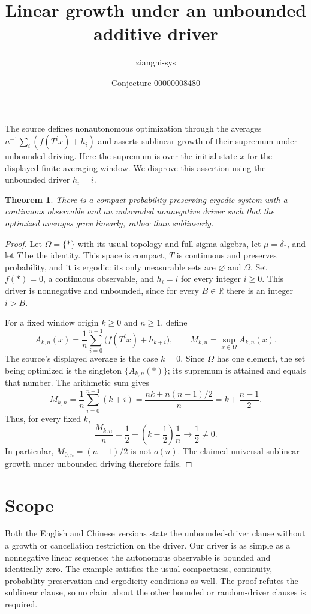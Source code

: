 \documentclass[11pt]{article}
\title{Linear growth under an unbounded additive driver}
\author{ziangni-sys}
\date{Conjecture 00000008480}
\newtheorem{theorem}{Theorem}
\begin{document}
\sloppy
\maketitle
\noindent The source defines nonautonomous optimization through the averages
$n^{-1}\sum_i(f(T^i x)+h_i)$ and asserts sublinear growth of their supremum
under unbounded driving. Here the supremum is over the initial state $x$
for the displayed finite averaging window. We disprove this assertion using
the unbounded driver $h_i=i$.

\begin{theorem}
There is a compact probability-preserving ergodic system with a continuous
observable and an unbounded nonnegative driver such that the optimized
averages grow linearly, rather than sublinearly.
\end{theorem}
\begin{proof}
Let $\Omega=\{*\}$ with its usual topology and full sigma-algebra, let
$\mu=\delta_*$, and let $T$ be the identity. This space is compact, $T$ is
continuous and preserves probability, and it is ergodic: its only measurable
sets are $\varnothing$ and $\Omega$. Set $f(*)=0$, a continuous observable,
and $h_i=i$ for every integer $i\geq0$. This driver is nonnegative and
unbounded, since for every $B\in\mathbb R$ there is an integer $i>B$.

For a fixed window origin $k\geq0$ and $n\geq1$, define
\[
 A_{k,n}(x)=\frac1n\sum_{i=0}^{n-1}
       \bigl(f(T^i x)+h_{k+i}\bigr),\qquad
 M_{k,n}=\sup_{x\in\Omega} A_{k,n}(x).
\]
The source's displayed average is the case $k=0$. Since $\Omega$ has one
element, the set being optimized is the singleton $\{A_{k,n}(*)\}$;
its supremum is attained and equals that number. The arithmetic sum gives
\[
 M_{k,n}=\frac1n\sum_{i=0}^{n-1}(k+i)
 =\frac{nk+n(n-1)/2}{n}=k+\frac{n-1}{2}.
\]
Thus, for every fixed $k$,
\[
 \frac{M_{k,n}}{n}
 =\frac12+\left(k-\frac12\right)\frac1n
 \longrightarrow\frac12\ne0.
\]
In particular, $M_{0,n}=(n-1)/2$ is not $o(n)$. The claimed universal
sublinear growth under unbounded driving therefore fails.
\end{proof}

\section*{Scope}
Both the English and Chinese versions state the unbounded-driver clause
without a growth or cancellation restriction on the driver. Our driver is
as simple as a nonnegative linear sequence; the autonomous observable is
bounded and identically zero. The example satisfies the usual compactness,
continuity, probability preservation and ergodicity conditions as well.
The proof refutes the sublinear clause, so no claim about the other bounded
or random-driver clauses is required.
\end{document}
